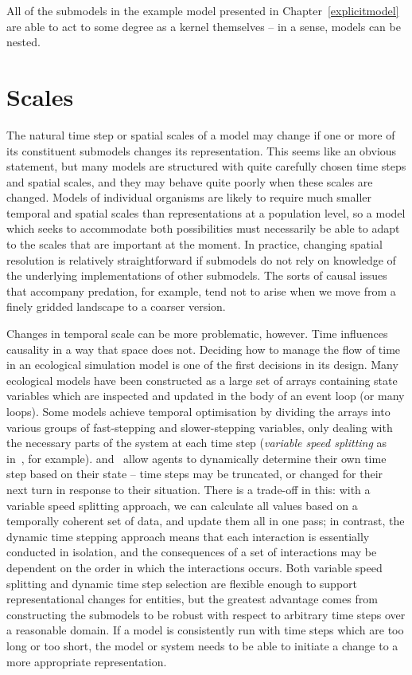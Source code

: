 All of the submodels in the example model presented in
Chapter~\ref{explicitmodel} are able to act to some degree as a kernel
themselves -- in a sense, models can be nested.

\section{Scales}
The natural time step or spatial scales of a model may change if one
or more of its constituent submodels changes its representation.
This seems like an obvious statement, but many models are structured
with quite carefully chosen time steps and spatial scales, and they
may behave quite poorly when these scales are changed.  Models of
individual organisms are likely to require much smaller temporal and
spatial scales than representations at a population level, so a model
which seeks to accommodate both possibilities must necessarily be able
to adapt to the scales that are important at the moment.  In practice,
changing spatial resolution is relatively straightforward if submodels
do not rely on knowledge of the underlying implementations of other
submodels.  The sorts of causal issues that accompany predation, for
example, tend not to arise when we move from a finely gridded
landscape to a coarser version.

Changes in temporal scale can be more problematic, however. Time
influences causality in a way that space does not. Deciding how to
manage the flow of time in an ecological simulation model is one of
the first decisions in its design.  Many ecological models have been
constructed as a large set of arrays containing state variables which
are inspected and updated in the body of an event loop (or many
loops). Some models achieve temporal optimisation by dividing the
arrays into various groups of fast-stepping and slower-stepping
variables, only dealing with the necessary parts of the system at each
time step (\emph{variable speed splitting\/} as
in~\cite{walters2000ecosystem}, for example). \Cite{gray2006nws}
and~\cite{gray2014} allow agents to dynamically determine their own
time step based on their state --  time steps may be truncated, or
changed for their next turn in response to their situation. There is a
trade-off in this: with a variable speed splitting approach, we can
calculate all values based on a temporally coherent set of data, and
update them all in one pass; in contrast, the dynamic time stepping
approach means that each interaction is essentially conducted in
isolation, and the consequences of a set of interactions may be
dependent on the order in which the interactions occurs. Both variable
speed splitting and dynamic time step selection are flexible enough to
support representational changes for entities, but the greatest
advantage comes from constructing the submodels to be robust with
respect to arbitrary time steps over a reasonable domain.  If a model
is consistently run with time steps which are too long or too short,
the model or system needs to be able to initiate a change to a more
appropriate representation.

